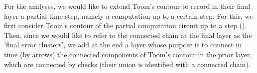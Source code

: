 %







For the analyses, we would like to extend Toom's contour to record in their final layer a partial time-step, namely a computation up to a certain step. For this, we first consider Toom's contour of the partial computation circuit up to a step (). Then, since we would like to refer to the connected chain at the final layer as the 'final error clusters', we add at the end a layer whose purpose is to connect in time (by arrows) the connected components of Toom's contour in the prior layer, which are connected by checks (their union is identified with a connected chain).

